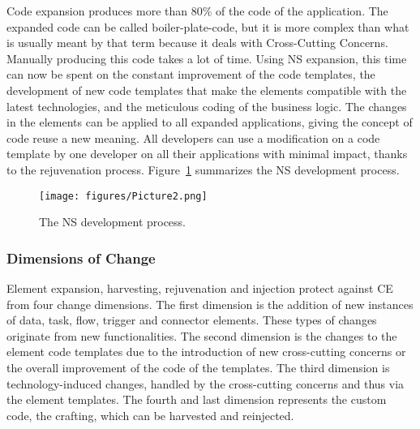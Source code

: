 Code expansion produces more than 80\% of the code of the application. The expanded code
can be called boiler-plate-code, but it is more complex than what is usually meant by that
term because it deals with Cross-Cutting Concerns. Manually producing this code takes a
lot of time. Using NS expansion, this time can now be spent on the constant improvement of
the code templates, the development of new code templates that make the elements
compatible with the latest technologies, and the meticulous coding of the business logic.
The changes in the elements can be applied to all expanded applications, giving the
concept of code reuse a new meaning. All developers can use a modification on a code
template by one developer on all their applications with minimal impact, thanks to the
rejuvenation process. Figure~\ref{fig_2} summarizes the NS development process.
\begin{figure}[htbp]
\centering
\centerline{\texttt{[image: figures/Picture2.png]}}
\caption{The NS development process.}
\label{fig_2}
\end{figure}
%
%
\subsubsection{Dimensions of Change}\label{Dimensions of Change} Element expansion,
harvesting, rejuvenation and injection protect against CE from four change dimensions. The
first dimension is the addition of new instances of data, task, flow, trigger and
connector elements. These types of changes originate from new functionalities. The second
dimension is the changes to the element code templates due to the introduction of new
cross-cutting concerns or the overall improvement of the code of the templates. The third
dimension is technology-induced changes, handled by the cross-cutting concerns and thus
via the element templates. The fourth and last dimension represents the custom code, the
crafting, which can be harvested and reinjected.

